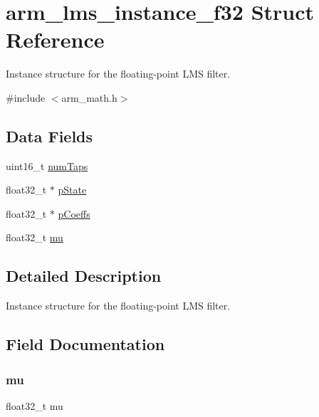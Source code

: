 \hypertarget{structarm__lms__instance__f32}{}\section{arm\+\_\+lms\+\_\+instance\+\_\+f32 Struct Reference}
\label{structarm__lms__instance__f32}


Instance structure for the floating-\/point L\+MS filter.  




{\ttfamily \#include $<$arm\+\_\+math.\+h$>$}

\subsection*{Data Fields}
\begin{DoxyCompactItemize}
\item 
uint16\+\_\+t \hyperlink{structarm__lms__instance__f32_a751941891e47f522a7f5375fe8990aac}{num\+Taps}
\item 
float32\+\_\+t $\ast$ \hyperlink{structarm__lms__instance__f32_a335c87e6fdc4b96601d95a5de8b9c463}{p\+State}
\item 
float32\+\_\+t $\ast$ \hyperlink{structarm__lms__instance__f32_aacbb8dd8eeba4b21fc2bb40076405ee3}{p\+Coeffs}
\item 
float32\+\_\+t \hyperlink{structarm__lms__instance__f32_a11402afa7c9b9dac4cb953fa386e74d2}{mu}
\end{DoxyCompactItemize}


\subsection{Detailed Description}
Instance structure for the floating-\/point L\+MS filter. 

\subsection{Field Documentation}
\mbox{\label{structarm__lms__instance__f32_a11402afa7c9b9dac4cb953fa386e74d2}} 
\subsubsection{\texorpdfstring{mu}{mu}}
{\footnotesize\ttfamily float32\+\_\+t mu}

